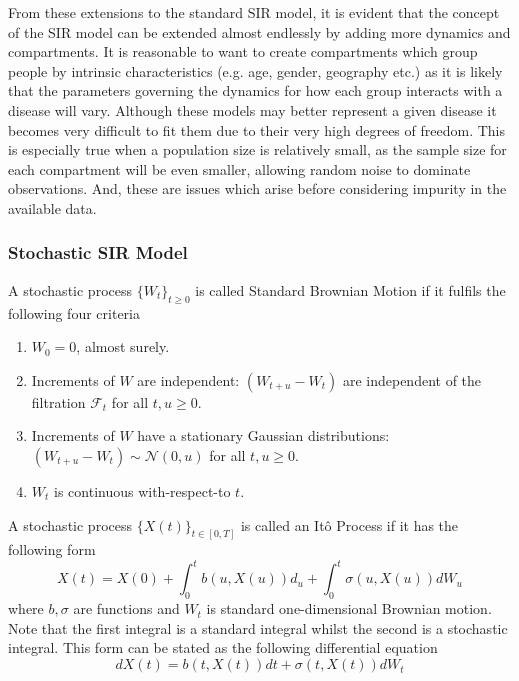 \documentclass[11pt,a4paper]{article}
\theoremstyle{break}
\begin{document}
  \par From these extensions to the standard SIR model, it is evident that the concept of the SIR model can be extended almost endlessly by adding more dynamics and compartments. It is reasonable to want to create compartments which group people by intrinsic characteristics (e.g. age, gender, geography etc.) as it is likely that the parameters governing the dynamics for how each group interacts with a disease will vary. Although these models may better represent a given disease it becomes very difficult to fit them due to their very high degrees of freedom. This is especially true when a population size is relatively small, as the sample size for each compartment will be even smaller, allowing random noise to dominate observations. And, these are issues which arise before considering impurity in the available data.

\subsubsection{Stochastic SIR Model}

  \begin{box_definition}
    A stochastic process $\{W_t\}_{t\geq0}$ is called Standard Brownian Motion if it fulfils the following four criteria
    \begin{enumerate}
      \item $W_0=0$, almost surely.
      \item Increments of $W$ are independent: $(W_{t+u}-W_t)$ are independent of the filtration $\mathcal{F}_t$ for all $t,u\geq0$.
      \item Increments of $W$ have a stationary Gaussian distributions: $(W_{t+u}-W_t)\sim\mathcal{N}(0,u)$ for all $t,u\geq0$.
      \item $W_t$ is continuous with-respect-to $t$.
    \end{enumerate}
  \end{box_definition}

  \begin{box_definition}[It\^o Process]
    A stochastic process $\{X(t)\}_{t\in[0,T]}$ is called an It\^o Process if it has the following form
    \[ X(t)=X(0)+\int_0^tb(u,X(u))d_u+\int_0^t\sigma(u,X(u))dW_u \]
    where $b,\sigma$ are functions and $W_t$ is standard one-dimensional Brownian motion. Note that the first integral is a standard integral whilst the second is a stochastic integral.
    \noindent This form can be stated as the following differential equation
    \[ dX(t)=b(t,X(t))dt+\sigma(t,X(t))dW_t \]
  \end{box_definition}
\end{document}
